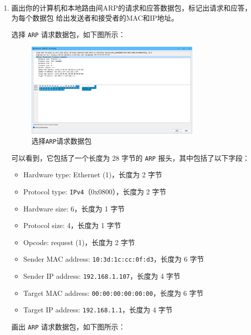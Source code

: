 \documentclass{article}
\begin{document}
\begin{enumerate}[noitemsep]
  \item 画出你的计算机和本地路由间ARP的请求和应答数据包，标记出请求和应答，为每个数据包 给出发送者和接受者的MAC和IP地址。

        选择 \texttt{ARP} 请求数据包，如下图所示：

        \begin{figure}[H]
          \centering
          \includegraphics[width=0.8\textwidth]{img/6.png}
          \caption{选择\texttt{ARP}请求数据包}
          \label{fig:6}
        \end{figure}

        可以看到，它包括了一个长度为 28 字节的 \texttt{ARP} 报头，其中包括了以下字段：

        \begin{itemize}[noitemsep]
          \item Hardware type: Ethernet (1)，长度为 2 字节
          \item Protocol type: \texttt{IPv4}（0x0800），长度为 2 字节
          \item Hardware size: 6，长度为 1 字节
          \item Protocol size: 4，长度为 1 字节
          \item Opcode: request (1)，长度为 2 字节
          \item Sender MAC address: \texttt{10:3d:1c:cc:0f:d3}，长度为 6 字节
          \item Sender IP address: \texttt{192.168.1.107}，长度为 4 字节
          \item Target MAC address: \texttt{00:00:00:00:00:00}，长度为 6 字节
          \item Target IP address: \texttt{192.168.1.1}，长度为 4 字节
        \end{itemize}

        画出 \texttt{ARP} 请求数据包，如下图所示：


\end{enumerate}
\end{document}
